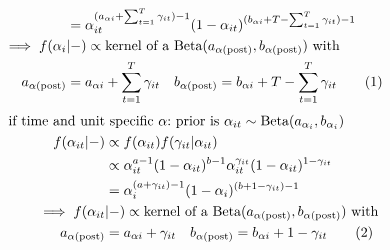 \documentclass[12pt,	%
	a4paper,		%
	twoside,		%
	openright,		%
	titlepage,%
	]{book}
\theoremstyle{definition}
\begin{document}
\begin{itemize}
\begin{align*}
    & = \alpha_{it}^{(a_{\alpha i}+\sum_{t=1}^T \gamma_{it})-1} (1-\alpha_{it})^{(b_{\alpha i}+T-\sum_{t=1}^T \gamma_{it})-1}\\
    \implies f(\alpha_i&|-)\propto \text{kernel of a $\Beta(a_{\postp{\alpha}},b_{\postp{\alpha}})$ with}\\
    a_{\postp{\alpha}} &= a_{\alpha i}+\sum_{t=1}^T \gamma_{it} \quad
    b_{\postp{\alpha}} = b_{\alpha i}+T-\sum_{t=1}^T \gamma_{it}
\tag{\stepcounter{equation}\theequation}
\end{align*}
\begin{align*}
    \text{if time and unit} & \text{ specific $\alpha$:} \text{ prior is $\alpha_{it} \sim \text{Beta}(a_{\alpha_i}, b_{\alpha_i})$}\\
    f(\alpha_{it}|-) & \propto f(\alpha_{it}) f(\gamma_{it}|\alpha_{it})\\
    & \propto \alpha_{it}^{a-1}(1-\alpha_{it})^{b-1} \alpha_{it}^{\gamma_{it}}(1-\alpha_{it})^{1-\gamma_{it}}\\
    & = \alpha_i^{(a+\gamma_{it})-1} (1-\alpha_i)^{(b+1-\gamma_{it})-1}\\
    \implies f(\alpha_{it}&|-)\propto \text{kernel of a $\Beta(a_{\postp{\alpha}},b_{\postp{\alpha}})$ with}\\
    a_{\postp{\alpha}} &= a_{\alpha i}+\gamma_{it} \quad
    b_{\postp{\alpha}} = b_{\alpha i}+1- \gamma_{it}
    \tag{\stepcounter{equation}\theequation}
\end{align*}




\end{itemize}
\end{document}
